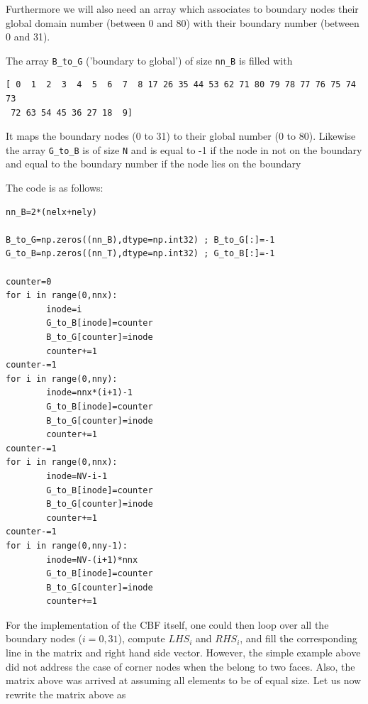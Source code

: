 Furthermore we will also need an array which associates to 
boundary nodes their {\color{teal} global domain number} (between 0 and 80)
with their {\color{teal} boundary number} (between 0 and 31).

The array \lstinline{B_to_G} ('boundary to global') 
of size \lstinline{nn_B} is filled with
\begin{lstlisting}
[ 0  1  2  3  4  5  6  7  8 17 26 35 44 53 62 71 80 79 78 77 76 75 74 73
 72 63 54 45 36 27 18  9]
\end{lstlisting}
It maps the {\color{brown} boundary nodes} (0 to 31) 
to their {\color{teal} global number} (0 to 80).
Likewise the array \lstinline{G_to_B} is of size \lstinline{N} 
and is equal to -1 if the node in not on the boundary and equal 
to the  {\color{brown} boundary number} if the node lies on the boundary

The code is as follows:
\begin{lstlisting}
nn_B=2*(nelx+nely)

B_to_G=np.zeros((nn_B),dtype=np.int32) ; B_to_G[:]=-1
G_to_B=np.zeros((nn_T),dtype=np.int32) ; G_to_B[:]=-1

counter=0
for i in range(0,nnx): 
        inode=i
        G_to_B[inode]=counter
        B_to_G[counter]=inode
        counter+=1
counter-=1
for i in range(0,nny):
        inode=nnx*(i+1)-1
        G_to_B[inode]=counter
        B_to_G[counter]=inode
        counter+=1
counter-=1
for i in range(0,nnx): 
        inode=NV-i-1
        G_to_B[inode]=counter
        B_to_G[counter]=inode
        counter+=1
counter-=1
for i in range(0,nny-1):
        inode=NV-(i+1)*nnx
        G_to_B[inode]=counter
        B_to_G[counter]=inode
        counter+=1
\end{lstlisting}





For the implementation of the CBF itself, one could then loop over
all the boundary nodes ($i=0,31$), compute $LHS_i$ and $RHS_i$, 
and fill the corresponding line in the matrix and right hand side vector.
However, the simple example above did not address the case of corner nodes
when the belong to two faces.
Also, the matrix above was arrived at assuming all elements to be of equal size. 
Let us now rewrite the matrix above as


